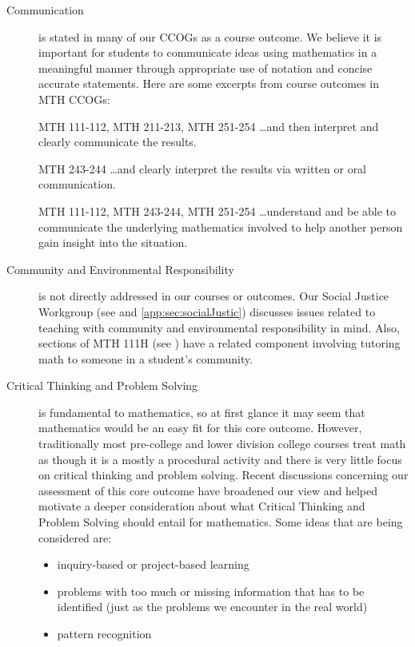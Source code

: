 \begin{description}
\item[Communication] is stated in many of our CCOGs as a course outcome. We
  believe it is important for students to communicate ideas using mathematics in
  a meaningful manner through appropriate use of notation and concise accurate
  statements.  Here are some excerpts from course outcomes in MTH CCOGs: 
\begin{aquote}{MTH 111-112, MTH 211-213, MTH 251-254}
{\ldots}and then interpret and clearly communicate the results. 
\end{aquote}

\begin{aquote}{MTH 243-244}
{\ldots}and clearly interpret the results via written or oral communication. 
\end{aquote}

\begin{aquote}{MTH 111-112, MTH 243-244, MTH 251-254}
{\ldots}understand and be able to communicate the underlying mathematics
involved to help another person gain insight into the situation.
\end{aquote}

\item[Community and Environmental Responsibility] is not directly addressed in
  our courses or outcomes. Our Social Justice Workgroup
  (see  and \vref{app:sec:socialJustic}) discusses issues
  related to teaching with community and environmental responsibility in mind.
  Also, sections of MTH 111H (see ) have a related component
  involving tutoring math to someone in a student's community. 

\item[Critical Thinking and Problem Solving] is fundamental to mathematics, so
  at first glance it may seem that mathematics would be an easy fit for this
  core outcome.  However, traditionally most pre-college and lower division
  college courses treat math as though it is a mostly a procedural activity and
  there is very little focus on critical thinking and problem solving.  Recent
  discussions concerning our assessment of this core outcome have broadened our
  view and helped motivate a deeper consideration about what Critical Thinking
  and Problem Solving should entail for mathematics.  Some ideas that are being
  considered are:
\begin{itemize}
\item inquiry-based or project-based learning
\item problems with too much or missing information that has to be identified
  (just as the problems we encounter in the real world)
\item pattern recognition
\end{itemize}


\end{description}
